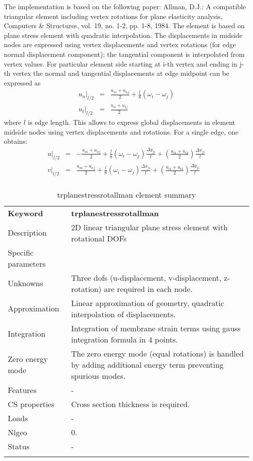 \documentclass[a4paper]{article}
\newcommand{\del}[2]{\mbox{$\displaystyle\frac{#1}{#2}$}}
\newcommand{\templabel}{}%
\newcommand{\tempcaption}{}%
\newcounter{nelpar}
\newenvironment{elementsummary}[5]{%
  \gdef\tempcaption{#4}%
  \gdef\templabel{#5}%
  \setcounter{nelpar}{0}%
  \begin{center} %
    \begin{table}[!htb] %
      \begin{tabular}{|l|p{9cm}|}\hline %
        {\bf Keyword} & \bf{#1}\\ %
        {Description} & {#2}\\ %
        {Specific parameters} & {#3}\\ \hline %
}{
  \\ \hline %
      \end{tabular}%
      \caption{\tempcaption}%
      \label{\templabel}%
    \end{table}%
  \end{center}%
}
\newcommand{\elementDescription}[2]{{#1} & {#2}\\ }
\begin{document}
The implementation is based on the following paper: Allman, D.J.: A compatible triangular element including vertex rotations for plane elasticity analysis, Computers \& Structures, vol. 19, no. 1-2, pp. 1-8, 1984.
The element is based on plane stress element with quadratic interpolation. The displacements in midside nodes are expressed using vertex displacements and vertex rotations (for edge normal displacement component); 
the tangential component is interpolated from vertex values.
For particular element side starting at i-th vertex and ending in j-th vertex the normal and tangential displacements at edge midpoint can be expressed as
\begin{eqnarray*}
u_n\vert_{l/2} &=& \del{u_{ni}+u_{nj}}{2}+\del{l}{8}(\omega_i-\omega_j)\\
u_t\vert_{l/2} &=& \del{u_{ti}+u_{tj}}{2}
\end{eqnarray*}
where $l$ is edge length. This allows to express global displacements in element midside nodes using vertex displacements and rotations. For a single edge, one obtains:
\begin{eqnarray*}
u\vert_{l/2} &=&-\del{u_{ni}+u_{nj}}{2}+\del{l}{8}(\omega_i-\omega_j)\del{\Delta y_{ji}}{l}+(\del{u_{t1}+u_{t2}}{2})\del{\Delta x_{ji}}{l}\\
v\vert_{l/2} &=& \del{u_{ni}+u_{nj}}{2}+\del{l}{8}(\omega_i-\omega_j)\del{\Delta x_{ji}}{l}+(\del{u_{t1}+u_{t2}}{2})\del{\Delta y_{ji}}{l}\\
\end{eqnarray*}

\begin{elementsummary}{trplanestressrotallman}{2D linear triangular plane stress element with rotational DOFs}{}{trplanestressrotallman element summary}{TrPlaneStressRotAllmansummary}
\elementDescription{Unknowns}{Three dofs (u-displacement, v-displacement, z-rotation) are required in each node.}
\elementDescription{Approximation}{Linear approximation of geometry, quadratic interpolation of displacements.}
\elementDescription{Integration}{Integration of membrane strain terms using gauss integration formula in 4 points.}
\elementDescription{Zero energy mode}{The zero energy mode (equal rotations) is handled by adding additional energy term preventing spurious modes.}

\elementDescription{Features}{-}
\elementDescription{CS properties}{Cross section thickness is required.}
\elementDescription{Loads}{-}
\elementDescription{Nlgeo}{0.}
\elementDescription{Status}{-}
\end{elementsummary}
\end{document}
